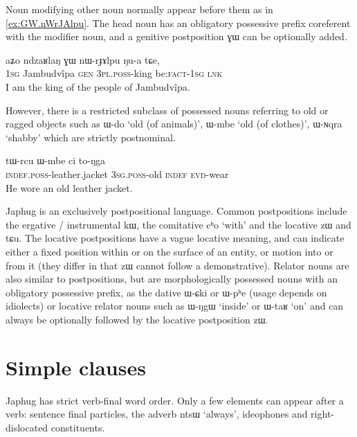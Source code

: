 \documentclass[oldfontcommands,oneside,a4paper,11pt]{article}
\newcommand{\ipa}[1]{{\phon #1}} %
\begin{document}
Noun modifying other noun normally appear before them as in \ref{ex:GW.nWrJAlpu}. The head noun has an obligatory possessive prefix coreferent with the modifier noun, and a genitive postposition \ipa{ɣɯ} can be optionally added.

\begin{exe}
\ex \label{ex:GW.nWrJAlpu}
\gll
\ipa{aʑo}  	\ipa{ndzaʁlaŋ}  	\ipa{ɣɯ}  	\ipa{nɯ-rɟɤlpu}  	\ipa{ŋu-a}  	\ipa{tɕe,}  
 \\
\textsc{1sg} Jambudvîpa \textsc{gen} \textsc{3pl.poss}-king  be:\textsc{fact}-\textsc{1sg} \textsc{lnk} \\
\glt I am the king of the people of Jambudvîpa.
\end{exe}

However, there is a  restricted subclass of possessed nouns referring to old or ragged objects such as \ipa{ɯ-do} `old (of animals)', \ipa{ɯ-mbe} `old (of clothes)', \ipa{ɯ-ɴqra} `shabby' which are strictly postnominal.


\begin{exe}
\ex \label{ex:Wmbe}
\gll
\ipa{tɯ-rcu} 	\ipa{ɯ-mbe} 	\ipa{ci} 	\ipa{to-ŋga} \\
\textsc{indef.poss}-leather.jacket \textsc{3sg.poss}-old \textsc{indef} \textsc{evd}-wear \\
\glt He wore an old leather jacket.
\end{exe}

Japhug is an exclusively postpositional language. Common postpositions include the ergative / instrumental \ipa{kɯ}, the comitative \ipa{cʰo} `with' and the locative \ipa{zɯ} and \ipa{tɕu}. The locative postpositions have a vague locative meaning, and can indicate either a fixed position within or on the surface of an entity, or motion into or from it (they differ in that \ipa{zɯ} cannot follow a demonstrative). Relator nouns are also similar to postpositions, but are morphologically possessed nouns with an obligatory possessive prefix, as the dative \ipa{ɯ-ɕki} or \ipa{ɯ-pʰe} (usage depends on  idiolects) or locative relator nouns such as \ipa{ɯ-ŋgɯ} `inside' or \ipa{ɯ-taʁ} `on' and can always be optionally followed by the locative postposition \ipa{zɯ}.

\section{Simple clauses} 

Japhug has strict verb-final word order. Only a few elements can appear after a verb: sentence final particles, the adverb \ipa{ntsɯ} `always', ideophones and right-dislocated constituents.
\end{document}

